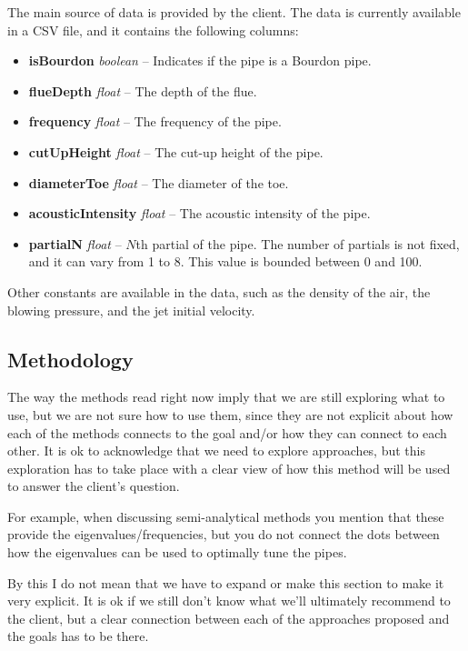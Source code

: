 \documentclass{psu-plan}
\begin{document}
The main source of data is provided by the client.
The data is currently available in a CSV file, and it contains the following
columns:
\begin{itemize}
    \item \textbf{isBourdon} \textit{boolean} -- Indicates if the pipe is a Bourdon pipe.
    \item \textbf{flueDepth} \textit{float} -- The depth of the flue.
    \item \textbf{frequency} \textit{float} -- The frequency of the pipe.
    \item \textbf{cutUpHeight} \textit{float} -- The cut-up height of the pipe.
    \item \textbf{diameterToe} \textit{float} -- The diameter of the toe.
    \item \textbf{acousticIntensity} \textit{float} -- The acoustic intensity of the pipe.
    \item \textbf{partialN} \textit{float} -- \(N\)th partial of the pipe.
        The number of partials is not fixed, and it can vary from 1 to 8.
        This value is bounded between 0 and 100.
\end{itemize}
Other constants are available in the data, such as the density of the air,
the blowing pressure, and the jet initial velocity.

\subsection{Methodology}

{
    The way the methods read right now imply that we are still exploring what to use, but we are not sure how to use them, since they are not explicit about how each of the methods connects to the goal and/or how they can connect to each other.  It is ok to acknowledge that we need to explore approaches, but this exploration has to take place with a clear view of how this method will be used to answer the client's question.

For example, when discussing semi-analytical methods you mention that these provide the eigenvalues/frequencies, but you do not connect the dots between how the eigenvalues can be used to optimally tune the pipes.  

By this I do not mean that we have to expand or make this section to make it very explicit. It is ok if we still don't know what we'll ultimately recommend to the client, but a clear connection between each of the approaches proposed and the goals has to be there. 

}
\end{document}
